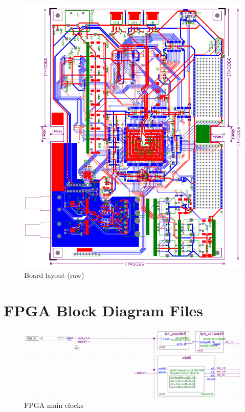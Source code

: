 \begin{appendices}
\begin{figure}[ht!]
    \centering
    \includegraphics[width=6in]{circuit/board_page.png}
		\caption{Board layout (raw)}
\end{figure}

\chapter{FPGA Block Diagram Files} \label{App:fpgablockdiagrams}

\begin{figure}[ht!]
    \centering
    \includegraphics[width=6in]{fpga_logic/clocks.png}
		\caption{FPGA main clocks}
\end{figure}


\end{appendices}
